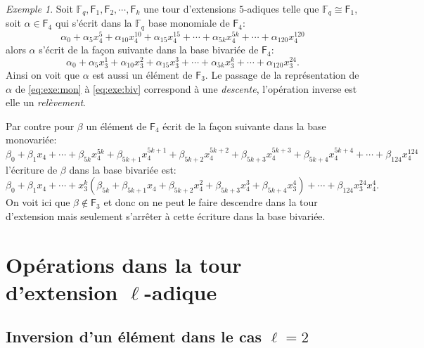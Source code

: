 \documentclass[10pt,a4paper]{book}
\theoremstyle{plain}
\theoremstyle{definition}
\theoremstyle{definition}
\theoremstyle{definition}
\theoremstyle{definition}
\theoremstyle{definition}
\theoremstyle{remark}
\theoremstyle{remark}
\newtheorem{exe}[thm]{Exemple}
\theoremstyle{definition}
\begin{document}
\begin{exe}
Soit $\mathbb{F}_q, \mathsf{F}_1, \mathsf{F}_2, \cdots, \mathsf{F}_k$ une tour d'extensions $5$-adiques telle que $\mathbb{F}_q \cong \mathsf{F}_1$, soit $\alpha \in \mathsf{F}_4$ qui s'écrit dans la $\mathbb{F}_q$ base monomiale de $\mathsf{F}_4$:
\begin{equation}
\label{eq:exe:mon}
\alpha_0 + \alpha_5x_4^5+ \alpha_{10}x_4^{10} + \alpha_{15}x_4^{15} + \cdots + \alpha_{5k}x_4^{5k} + \cdots + \alpha_{120}x_4^{120} 
\end{equation} 
alors $\alpha$ s'écrit de la façon suivante dans la base bivariée de $\mathsf{F}_4$:
\begin{equation}
\label{eq:exe:biv}
\alpha_0 + \alpha_5x_3^1+ \alpha_{10}x_3^{2} + \alpha_{15}x_3^{3} + \cdots + \alpha_{5k}x_3^{k} + \cdots + \alpha_{120}x_3^{24}. 
\end{equation} 
 Ainsi on voit que $\alpha$ est aussi un élément de $\mathsf{F}_3$. Le passage de la représentation de $\alpha$ de \eqref{eq:exe:mon} à \eqref{eq:exe:biv} correspond à une \emph{descente}, l'opération inverse est elle un \emph{relèvement}.
 
 Par contre pour $\beta$ un élément de $\mathsf{F}_4$ écrit de la façon suivante dans la base monovariée:
 \begin{equation*}
 \beta_0 + \beta_1 x_4+ \cdots +\beta_{5k}x_4^{5k} + \beta_{5k+1}x_4^{5k+1}+\beta_{5k+2}x_4^{5k+2}+ \beta_{5k+3}x_4^{5k+3}+ \beta_{5k+4}x_4^{5k+4}+ \cdots + \beta_{124}x_4^{124}
 \end{equation*}
l'écriture de $\beta$ dans la base bivariée est: 
 \begin{equation*}
  \beta_0 + \beta_1 x_4+ \cdots + x_3^{k}(\beta_{5k}+\beta_{5k+1} x_4 + \beta_{5k+2} x_4^2 + \beta_{5k+3} x_4^3 + \beta_{5k+4}x_3^4)+ \cdots + \beta_{124}x_3^{24}x_4^{4}.
 \end{equation*}
 On voit ici que $\beta \notin \mathsf{F}_3$ et donc on ne peut le faire descendre dans la tour d'extension mais seulement s'arrêter à cette écriture dans la base bivariée.
\end{exe}

\section{Opérations dans la tour d'extension $\ell$-adique}

\subsection*{Inversion d'un élément dans le cas $\ell=2$}
\end{document}
